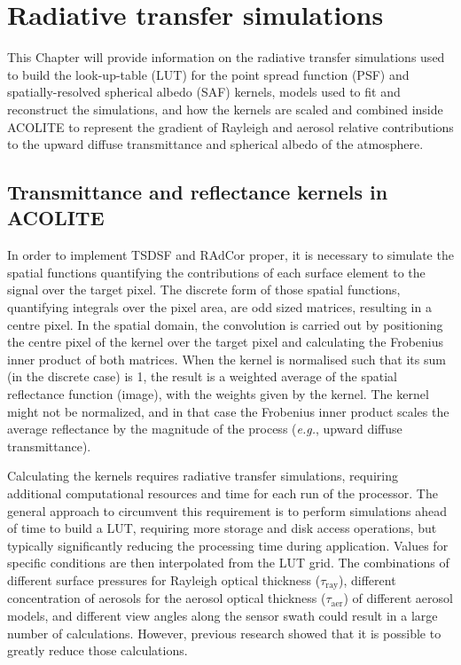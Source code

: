 \chapter{Radiative transfer simulations} \label{ap:apsfs}

This Chapter will provide information on the radiative transfer simulations used to build the look-up-table (LUT) for the point spread function (PSF) and spatially-resolved spherical albedo (SAF) kernels, models used to fit and reconstruct the simulations, and how the kernels are scaled and combined inside ACOLITE to represent the gradient of Rayleigh and aerosol relative contributions to the upward diffuse transmittance and spherical albedo of the atmosphere.

\section{Transmittance and reflectance kernels in ACOLITE}

In order to implement TSDSF and RAdCor proper, it is necessary to simulate the spatial functions quantifying the contributions of each surface element to the signal over the target pixel. The discrete form of those spatial functions, quantifying integrals over the pixel area, are odd sized matrices, resulting in a centre pixel. In the spatial domain, the convolution is carried out by positioning the centre pixel of the kernel over the target pixel and calculating the Frobenius inner product of both matrices. When the kernel is normalised such that its sum (in the discrete case) is 1, the result is a weighted average of the spatial reflectance function (image), with the weights given by the kernel. The kernel might not be normalized, and in that case the Frobenius inner product scales the average reflectance by the magnitude of the process (\textit{e.g.}, upward diffuse transmittance).

Calculating the kernels requires radiative transfer simulations, requiring additional computational resources and time for each run of the processor. The general approach to circumvent this requirement is to perform simulations ahead of time to build a LUT, requiring more storage and disk access operations, but typically significantly reducing the processing time during application. Values for specific conditions are then interpolated from the LUT grid. The combinations of different surface pressures for Rayleigh optical thickness ($\tau_\text{ray}$), different concentration of aerosols for the aerosol optical thickness ($\tau_\text{aer}$) of different aerosol models, and different view angles along the sensor swath could result in a large number of calculations. However, previous research showed that it is possible to greatly reduce those calculations.   

